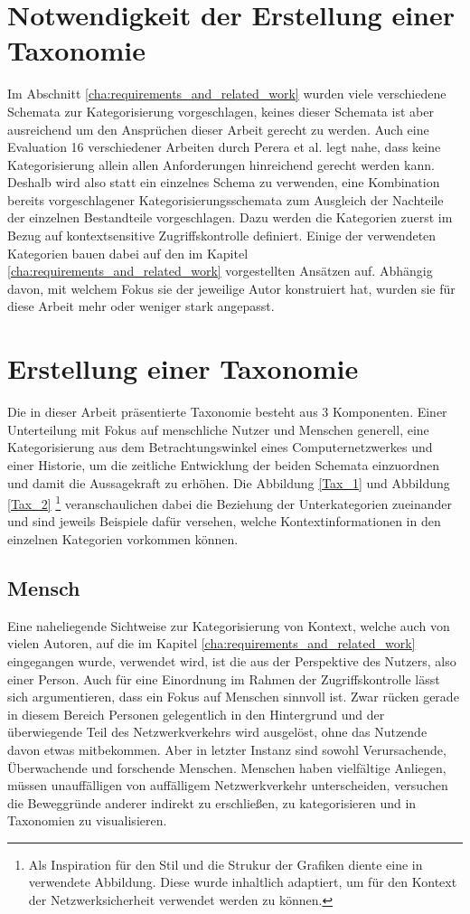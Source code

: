 \section{Notwendigkeit der Erstellung einer Taxonomie }
Im Abschnitt \ref{cha:requirements_and_related_work} wurden viele verschiedene Schemata zur Kategorisierung vorgeschlagen, keines dieser Schemata ist aber ausreichend um den Ansprüchen dieser Arbeit gerecht zu werden. Auch eine Evaluation 16 verschiedener Arbeiten durch Perera et al. \cite{perera_context_2014} legt nahe, dass keine Kategorisierung allein allen Anforderungen hinreichend gerecht werden kann.
Deshalb wird also statt ein einzelnes Schema zu verwenden, eine Kombination bereits vorgeschlagener Kategorisierungsschemata zum Ausgleich der Nachteile der einzelnen Bestandteile vorgeschlagen. Dazu werden die Kategorien zuerst im Bezug auf kontextsensitive Zugriffskontrolle definiert. Einige der verwendeten Kategorien bauen dabei auf den im Kapitel \ref{cha:requirements_and_related_work} vorgestellten Ansätzen auf. Abhängig davon, mit welchem Fokus sie der jeweilige Autor konstruiert hat, wurden sie für diese Arbeit mehr oder weniger stark angepasst.
\section{Erstellung einer Taxonomie}
\label{sec:tax_erstellung}
Die in dieser Arbeit präsentierte Taxonomie besteht aus 3 Komponenten. Einer Unterteilung mit Fokus auf menschliche Nutzer und Menschen generell, eine Kategorisierung aus dem Betrachtungswinkel eines Computernetzwerkes und einer Historie, um die zeitliche Entwicklung der beiden Schemata einzuordnen und damit die Aussagekraft zu erhöhen.
Die Abbildung \ref{Tax_1} und Abbildung \ref{Tax_2} \footnote{Als Inspiration für den Stil und die Strukur der Grafiken diente eine in \cite{perera_context_2014} verwendete Abbildung. Diese wurde inhaltlich adaptiert, um für den Kontext der Netzwerksicherheit verwendet werden zu können.}  veranschaulichen dabei die Beziehung der Unterkategorien zueinander und sind jeweils Beispiele dafür versehen, welche Kontextinformationen in den einzelnen Kategorien vorkommen können. 
\subsection{Mensch}
Eine naheliegende Sichtweise zur Kategorisierung von Kontext, welche auch von vielen Autoren, auf die im Kapitel \ref{cha:requirements_and_related_work} eingegangen wurde, verwendet wird, ist die aus der Perspektive des Nutzers, also einer Person. Auch für eine Einordnung im Rahmen der Zugriffskontrolle lässt sich argumentieren, dass ein Fokus auf Menschen sinnvoll ist. Zwar rücken gerade in diesem Bereich Personen gelegentlich in den Hintergrund und der überwiegende Teil des Netzwerkverkehrs wird ausgelöst, ohne das Nutzende davon etwas mitbekommen. Aber in letzter Instanz sind sowohl Verursachende, Überwachende und forschende Menschen. Menschen haben vielfältige Anliegen, müssen unauffälligen von auffälligem Netzwerkverkehr unterscheiden, versuchen die Beweggründe anderer indirekt zu erschließen, zu kategorisieren und in Taxonomien zu visualisieren.

